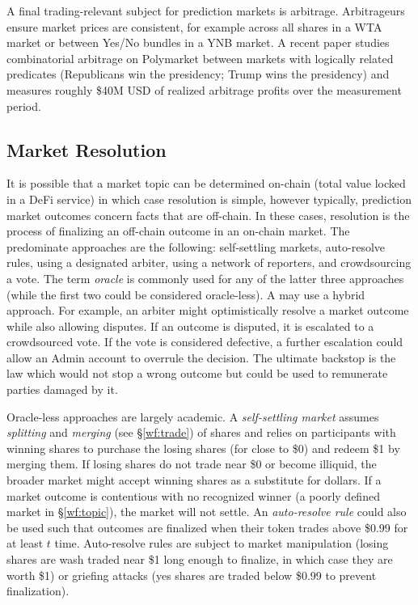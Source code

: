 A final trading-relevant subject for prediction markets is arbitrage. Arbitrageurs ensure market prices are consistent, for example across all shares in a WTA market or between Yes/No bundles in a YNB market. A recent paper studies combinatorial arbitrage on Polymarket between markets with logically related predicates (\eg Republicans win the presidency; Trump wins the presidency) and measures roughly \$40M USD of realized arbitrage profits over the measurement period. 


\subsection{Market Resolution}\label{wf:close}

It is possible that a market topic can be determined on-chain (\eg total value locked in a DeFi service) in which case resolution is simple, however typically, prediction market outcomes concern facts that are off-chain. In these cases, resolution is the process of finalizing an off-chain outcome in an on-chain market. The predominate approaches are the following: self-settling markets, auto-resolve rules, using a designated arbiter, using a network of reporters, and crowdsourcing a vote. The term \textit{oracle} is commonly used for any of the latter three approaches (while the first two could be considered oracle-less). A \depm may use a hybrid approach. For example, an arbiter might optimistically resolve a market outcome while also allowing disputes. If an outcome is disputed, it is escalated to a crowdsourced vote. If the vote is considered defective, a further escalation could allow an Admin account to overrule the decision. The ultimate backstop is the law which would not stop a wrong outcome but could be used to remunerate parties damaged by it.

Oracle-less approaches are largely academic. A \textit{self-settling market} assumes \textit{splitting} and \textit{merging} (see \S\ref{wf:trade}) of shares and relies on participants with winning shares to purchase the losing shares (for close to \$0) and redeem \$1 by merging them. If losing shares do not trade near \$0 or become illiquid, the broader market might accept winning shares as a substitute for dollars. If a market outcome is contentious with no recognized winner (\eg a poorly defined market in \S\ref{wf:topic}), the market will not settle. An \textit{auto-resolve rule} could also be used such that outcomes are finalized when their token trades above \$0.99 for at least $t$ time. Auto-resolve rules are subject to market manipulation (losing shares are wash traded near \$1 long enough to finalize, in which case they are worth \$1) or griefing attacks (yes shares are traded below \$0.99 to prevent finalization). 



